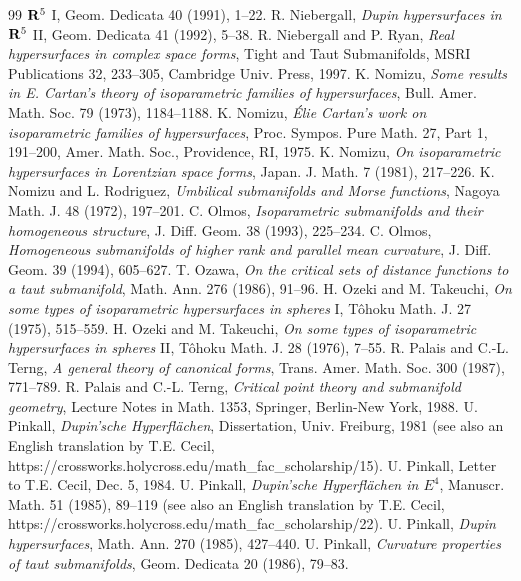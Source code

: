 \documentclass[12pt]{article}
\begin{document}
{\begin{thebibliography}{99}
{${\bf R}^5$} I, Geom. Dedicata 40 (1991), 1--22.
 R. Niebergall, 
{\em Dupin hypersurfaces in
${\bf R}^5$} II, Geom. Dedicata 41 (1992), 5--38.
 R. Niebergall and P. Ryan,
{\em Real hypersurfaces
in complex space forms}, Tight and Taut Submanifolds, MSRI
Publications 32, 233--305, Cambridge Univ. Press, 1997.
 K. Nomizu, {\em Some results in E. Cartan's
theory of isoparametric families of hypersurfaces}, Bull.
Amer. Math. Soc. 79 (1973), 1184--1188.
 K. Nomizu, {\em \'{E}lie Cartan's
work on isoparametric families of hypersurfaces}, Proc.
Sympos. Pure Math. 27, Part 1, 191--200, Amer. Math. Soc., 
Providence, RI, 1975.
 K. Nomizu, {\em On 
isoparametric hypersurfaces in Lorentzian space forms},
Japan. J. Math. 7 (1981), 217--226.
 K. Nomizu and L. Rodriguez, {\em Umbilical
submanifolds and Morse functions}, Nagoya Math. J. 48 (1972), 197--201.
 C. Olmos, {\em Isoparametric submanifolds and their
homogeneous structure}, J. Diff. Geom. 38 (1993), 225--234.
 C. Olmos, {\em Homogeneous
submanifolds of higher rank and parallel mean curvature}, J. Diff.
Geom. 39 (1994), 605--627.
 T. Ozawa, {\em On the critical sets of distance functions
to a taut submanifold}, Math. Ann. 276 (1986), 91--96.
 H. Ozeki and M. Takeuchi, {\em On some types of
isoparametric hypersurfaces in spheres} I, T\^{o}hoku
Math. J. 27 (1975), 515--559.
 H. Ozeki and M. Takeuchi, {\em On some types of
isoparametric hypersurfaces in spheres} II, T\^{o}hoku
Math. J.  28 (1976), 7--55.
 R. Palais and C.-L. Terng, {\em A general theory
of canonical forms}, Trans. Amer. Math. Soc. 300 (1987), 771--789.
R. Palais and C.-L. Terng, {\em Critical point
theory and submanifold geometry}, Lecture Notes in Math. 1353,
Springer, Berlin-New York, 1988.
U. Pinkall, {\em Dupin'sche Hyperfl\"{a}chen},
Dissertation, Univ. Freiburg, 1981 (see also an English translation by T.E. Cecil, \\
https://crossworks.holycross.edu/math\_fac\_scholarship/15).
 U. Pinkall, Letter to T.E. Cecil, Dec. 5, 1984.
 U. Pinkall, {\em Dupin'sche
Hyperfl\"{a}chen in $E^4$}, Manuscr. Math. 51 (1985), 89--119
(see also an English translation by T.E. Cecil, \\
https://crossworks.holycross.edu/math\_fac\_scholarship/22).
 U. Pinkall, {\em Dupin
hypersurfaces}, Math. Ann. 270 (1985), 427--440.
 U. Pinkall, {\em Curvature
properties of taut submanifolds}, Geom. Dedicata 20 (1986), 79--83.

\end{thebibliography}}
\end{document}
